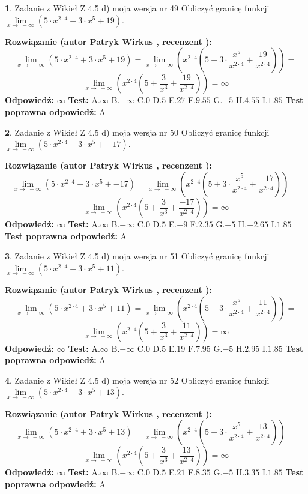 \documentclass[12pt, a4paper]{article}
\theoremstyle{definition} %
\newtheorem{zad}{}
\newcommand{\zadStart}[1]{\begin{zad}#1\newline}
\newcommand{\zadStop}{\end{zad}}
\newcommand{\rozwStart}[2]{\noindent \textbf{Rozwiązanie (autor #1 , recenzent #2): }\newline}
\newcommand{\rozwStop}{\newline}
\newcommand{\odpStart}{\noindent \textbf{Odpowiedź:}\newline}
\newcommand{\odpStop}{\newline}
\newcommand{\testStart}{\noindent \textbf{Test:}\newline}
\newcommand{\testStop}{\newline}
\newcommand{\kluczStart}{\noindent \textbf{Test poprawna odpowiedź:}\newline}
\newcommand{\kluczStop}{\newline}
\begin{document}
\zadStart{Zadanie z Wikieł Z 4.5 d) moja wersja nr 49}
Obliczyć granicę funkcji  $\lim\limits_{x\to\ -\infty}(5 \cdot x^{2\cdot4}+3 \cdot x^{5}+19)$.
\zadStop
\rozwStart{Patryk Wirkus}{}
$$\lim\limits_{x\to\ -\infty}(5 \cdot x^{2\cdot4}+3 \cdot x^{5}+19) = \lim\limits_{x\to\ -\infty}(x^{2\cdot4}(5 +3 \cdot \frac{x^{5}}{x^{2\cdot4}}+\frac{19}{x^{2\cdot4}})) =$$ $$\lim\limits_{x\to\ -\infty}(x^{2\cdot4}(5 +\frac{3}{x^{3}}+\frac{19}{x^{2\cdot4}})) =\infty$$
\rozwStop
\odpStart
$\infty$
\odpStop
\testStart
A.$\infty$ B.$-\infty$ C.$0$ D.$5$ E.$27$
F.$9.55$ G.$-5$
H.$4.55$
I.$1.85$
\testStop
\kluczStart
A
\kluczStop



\zadStart{Zadanie z Wikieł Z 4.5 d) moja wersja nr 50}
Obliczyć granicę funkcji  $\lim\limits_{x\to\ -\infty}(5 \cdot x^{2\cdot4}+3 \cdot x^{5}+-17)$.
\zadStop
\rozwStart{Patryk Wirkus}{}
$$\lim\limits_{x\to\ -\infty}(5 \cdot x^{2\cdot4}+3 \cdot x^{5}+-17) = \lim\limits_{x\to\ -\infty}(x^{2\cdot4}(5 +3 \cdot \frac{x^{5}}{x^{2\cdot4}}+\frac{-17}{x^{2\cdot4}})) =$$ $$\lim\limits_{x\to\ -\infty}(x^{2\cdot4}(5 +\frac{3}{x^{3}}+\frac{-17}{x^{2\cdot4}})) =\infty$$
\rozwStop
\odpStart
$\infty$
\odpStop
\testStart
A.$\infty$ B.$-\infty$ C.$0$ D.$5$ E.$-9$
F.$2.35$ G.$-5$
H.$-2.65$
I.$1.85$
\testStop
\kluczStart
A
\kluczStop



\zadStart{Zadanie z Wikieł Z 4.5 d) moja wersja nr 51}
Obliczyć granicę funkcji  $\lim\limits_{x\to\ -\infty}(5 \cdot x^{2\cdot4}+3 \cdot x^{5}+11)$.
\zadStop
\rozwStart{Patryk Wirkus}{}
$$\lim\limits_{x\to\ -\infty}(5 \cdot x^{2\cdot4}+3 \cdot x^{5}+11) = \lim\limits_{x\to\ -\infty}(x^{2\cdot4}(5 +3 \cdot \frac{x^{5}}{x^{2\cdot4}}+\frac{11}{x^{2\cdot4}})) =$$ $$\lim\limits_{x\to\ -\infty}(x^{2\cdot4}(5 +\frac{3}{x^{3}}+\frac{11}{x^{2\cdot4}})) =\infty$$
\rozwStop
\odpStart
$\infty$
\odpStop
\testStart
A.$\infty$ B.$-\infty$ C.$0$ D.$5$ E.$19$
F.$7.95$ G.$-5$
H.$2.95$
I.$1.85$
\testStop
\kluczStart
A
\kluczStop



\zadStart{Zadanie z Wikieł Z 4.5 d) moja wersja nr 52}
Obliczyć granicę funkcji  $\lim\limits_{x\to\ -\infty}(5 \cdot x^{2\cdot4}+3 \cdot x^{5}+13)$.
\zadStop
\rozwStart{Patryk Wirkus}{}
$$\lim\limits_{x\to\ -\infty}(5 \cdot x^{2\cdot4}+3 \cdot x^{5}+13) = \lim\limits_{x\to\ -\infty}(x^{2\cdot4}(5 +3 \cdot \frac{x^{5}}{x^{2\cdot4}}+\frac{13}{x^{2\cdot4}})) =$$ $$\lim\limits_{x\to\ -\infty}(x^{2\cdot4}(5 +\frac{3}{x^{3}}+\frac{13}{x^{2\cdot4}})) =\infty$$
\rozwStop
\odpStart
$\infty$
\odpStop
\testStart
A.$\infty$ B.$-\infty$ C.$0$ D.$5$ E.$21$
F.$8.35$ G.$-5$
H.$3.35$
I.$1.85$
\testStop
\kluczStart
A
\kluczStop
\end{document}
